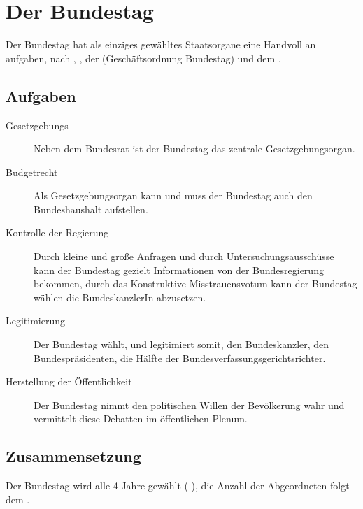 \documentclass{article}
\begin{document}
\section{Der Bundestag}
Der Bundestag hat als einziges gewähltes Staatsorgane eine Handvoll an aufgaben, nach  \GG, , der \GOBT (Geschäftsordnung Bundestag) und dem .

\subsection{Aufgaben}
\begin{description}
 \item[Gesetzgebungs] Neben dem Bundesrat ist der Bundestag das zentrale Gesetzgebungsorgan.
 \item[Budgetrecht] Als Gesetzgebungsorgan kann und muss der Bundestag auch den Bundeshaushalt aufstellen.
 \item[Kontrolle der Regierung] Durch kleine und große Anfragen und durch Untersuchungsausschüsse kann der Bundestag gezielt Informationen von der Bundesregierung bekommen, durch das Konstruktive Misstrauensvotum kann der Bundestag wählen die BundeskanzlerIn abzusetzen.
 \item[Legitimierung] Der Bundestag wählt, und legitimiert somit, den Bundeskanzler, den Bundespräsidenten, die Hälfte der Bundesverfassungsgerichtsrichter.
 \item[Herstellung der Öffentlichkeit] Der Bundestag nimmt den politischen Willen der Bevölkerung wahr und vermittelt diese Debatten im öffentlichen Plenum.
\end{description}

\subsection{Zusammensetzung}
Der Bundestag wird alle 4 Jahre gewählt ( \GG), die Anzahl der Abgeordneten folgt dem .
\end{document}
